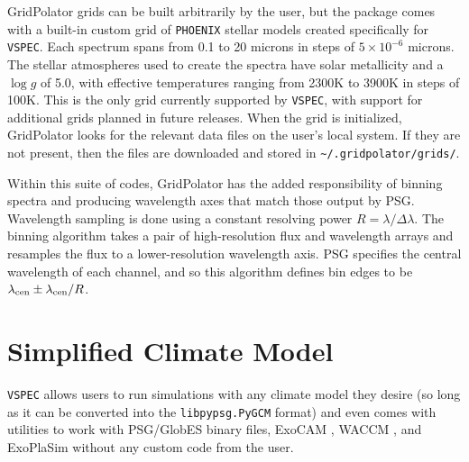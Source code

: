 \documentclass[linenumbers,5p,twocolumn,authoryear]{elsarticle}
\newcommand{\teff}{$T_{\rm eff}$}
\newcommand{\TJ}[1]{\textcolor{tedcommentcolor}{#1}}
\newcommand{\vspec}[1]{\texttt{VSPEC}#1}
\begin{document}
GridPolator grids can be built arbitrarily by the user, but the package comes with a built-in custom grid of \texttt{PHOENIX} stellar models \citep{allard1994,hauschildt1999,husser2013} created specifically for \vspec{}. Each spectrum spans from 0.1 to 20 microns in steps of $5\times10^{-6}$ microns. The stellar atmospheres used to create the spectra have solar metallicity and a $\log{g}$ of 5.0, with effective temperatures ranging from 2300K to 3900K in steps of 100K. This is the only grid currently supported by \vspec{}, with support for additional grids planned in future releases.
When the grid is initialized, GridPolator looks for the relevant data files on the user's local system. If they are not present, then the files are downloaded and stored in \texttt{\textasciitilde /.gridpolator/grids/}. 

Within this suite of codes, GridPolator has the added responsibility of binning spectra and producing wavelength axes that match those output by PSG. Wavelength sampling is done using a constant resolving power $R=\lambda/{\Delta \lambda}$. The binning algorithm takes a pair of high-resolution flux and wavelength arrays and resamples the flux to a lower-resolution wavelength axis. PSG specifies the central wavelength of each channel, and so this algorithm defines bin edges to be $\lambda_{\rm cen} \pm {\lambda_{\rm cen}}/{R}$.

\section{Simplified Climate Model}
\label{sec:vspec-gcm}
\vspec{} allows users to run simulations with any climate model they desire (so long as it can be converted into the \texttt{libpypsg.PyGCM} format) and even comes with utilities to work with PSG/GlobES binary files, ExoCAM \citep{wolf2022}, WACCM \citep{marsh2013}, and ExoPlaSim \citep{paradise2022} without any custom code from the user.
\end{document}
